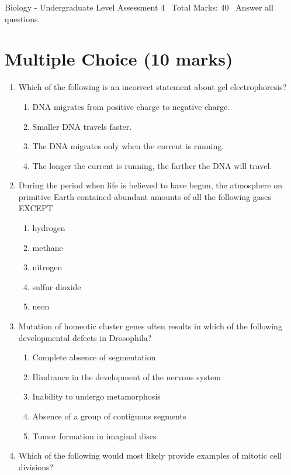 \documentclass[12pt]{article}
\begin{document}
\begin{center}
Biology - Undergraduate Level Assessment 4 \
Total Marks: 40 \
Answer all questions.
\end{center}

\section*{Multiple Choice (10 marks)}
\begin{enumerate}[label=\arabic*.]
\item Which of the following is an incorrect statement about gel electrophoresis?
\begin{enumerate}[label=(\alph*)]
    \item DNA migrates from positive charge to negative charge.
    \item Smaller DNA travels faster.
    \item The DNA migrates only when the current is running.
    \item The longer the current is running, the farther the DNA will travel.
\end{enumerate}
\item During the period when life is believed to have begun, the atmosphere on primitive Earth contained abundant amounts of all the following gases EXCEPT
\begin{enumerate}[label=(\alph*)]
    \item hydrogen
    \item methane
    \item nitrogen
    \item sulfur dioxide
    \item neon
\end{enumerate}
\item Mutation of homeotic cluster genes often results in which of the following developmental defects in Drosophila?
\begin{enumerate}[label=(\alph*)]
    \item Complete absence of segmentation
    \item Hindrance in the development of the nervous system
    \item Inability to undergo metamorphosis
    \item Absence of a group of contiguous segments
    \item Tumor formation in imaginal discs
\end{enumerate}
\item Which of the following would most likely provide examples of mitotic cell divisions?

\end{enumerate}
\end{document}
